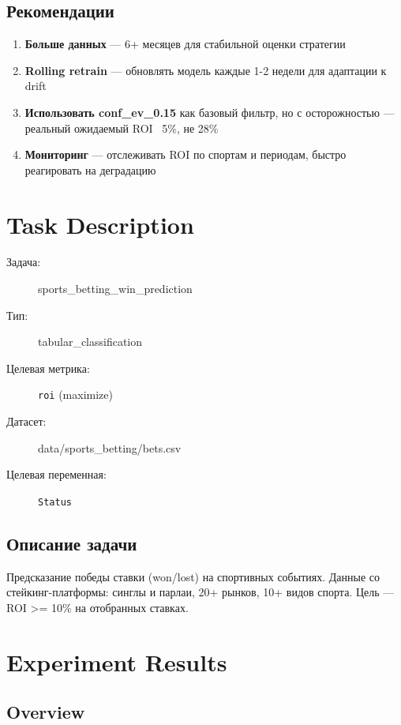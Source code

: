 \documentclass[12pt,a4paper]{article}
\begin{document}
\subsection{Рекомендации}
\begin{enumerate}
  \item \textbf{Больше данных} — 6+ месяцев для стабильной оценки стратегии
  \item \textbf{Rolling retrain} — обновлять модель каждые 1-2 недели для адаптации к drift
  \item \textbf{Использовать conf\_ev\_0.15} как базовый фильтр, но с осторожностью — реальный ожидаемый ROI ~5\%, не 28\%
  \item \textbf{Мониторинг} — отслеживать ROI по спортам и периодам, быстро реагировать на деградацию
\end{enumerate}




\section{Task Description}

\begin{description}
    \item[Задача:] sports\_betting\_win\_prediction
    \item[Тип:] tabular\_classification
    \item[Целевая метрика:] \texttt{roi}
        (maximize)
    \item[Датасет:] data/sports\_betting/bets.csv
    \item[Целевая переменная:] \texttt{Status}
\end{description}

\subsection*{Описание задачи}
Предсказание победы ставки (won/lost) на спортивных событиях. Данные со стейкинг-платформы: синглы и парлаи, 20+ рынков, 10+ видов спорта. Цель — ROI >= 10\% на отобранных ставках.




\section{Experiment Results}

\subsection{Overview}
\end{document}
